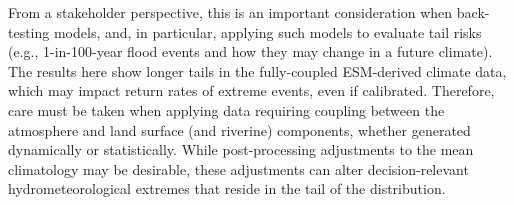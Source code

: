\documentclass[nhess, manuscript]{copernicus}
\begin{document}
From a stakeholder perspective, this is an important consideration when back-testing models, and, in particular, applying such models to evaluate tail risks (e.g., 1-in-100-year flood events and how they may change in a future climate). 
The results here show longer tails in the fully-coupled ESM-derived climate data, which may impact return rates of extreme events, even if calibrated. 
Therefore, care must be taken when applying data requiring coupling between the atmosphere and land surface (and riverine) components, whether generated dynamically or statistically. 
While post-processing adjustments to the mean climatology may be desirable, these adjustments can alter decision-relevant hydrometeorological extremes that reside in the tail of the distribution.







%
%
%
%
%
%
%
%
%
%
\end{document}
